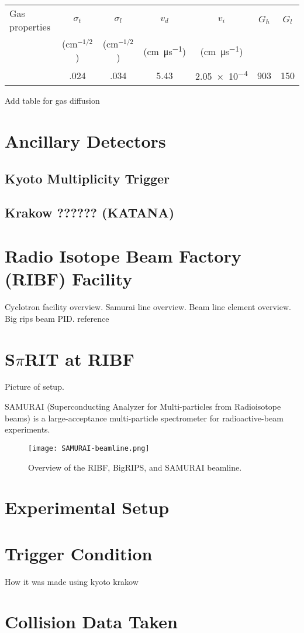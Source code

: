 \begin{table}[!htp] %
\centering %
\begin{tabular}{
  @{}
  l
  S[table-format=1.2]
  S[table-format=1.2]
  S[table-format=1.2]
  S[table-format=1.2]
  S[table-format=5.2]
  S[table-format=5.2]
  @{}
}
\toprule
Gas properties &
 {$\sigma_{t}$} &
 {$\sigma_{l}$} &
 {$v_{d}$} &
 {$v_{i}$}  &
 {$G_{h}$} &
 {$G_{l}$} \\
&
  {($\si{\centi\meter}^{-1/2}$)} &
  {($\si{\centi\meter}^{-1/2}$)} &
  {(\si{\centi\meter\per\micro\second})} &
 {(\si{\centi\meter\per\micro\second})} \\

\midrule
\phantom{abc}   &.024   &.034  &5.43  &  \num{2.05e-4} &  903   &150     \\
\bottomrule
\end{tabular}

\caption{}
\label{tb:gasprop}
\end{table}


Add table for gas diffusion 


\section{Ancillary Detectors }
\subsection{Kyoto Multiplicity Trigger}
\subsection{Krakow ?????? (KATANA)}

\section{Radio Isotope Beam Factory (RIBF) Facility }
Cyclotron facility overview.
Samurai line overview.
Beam line element overview.
Big rips beam PID. reference 


\section{S$\pi$RIT at RIBF}
Picture of setup. 




SAMURAI (Superconducting Analyzer for Multi-particles from Radioisotope beams) is a large-acceptance multi-particle spectrometer for radioactive-beam experiments.
\begin{figure}[H]
\texttt{[image: SAMURAI-beamline.png]}
\caption{Overview of the RIBF, BigRIPS, and SAMURAI beamline.}
\label{fig:sambl}
\end{figure}

\section{Experimental Setup}

\section{Trigger Condition}
How it was made using kyoto krakow

\section{Collision Data Taken}

